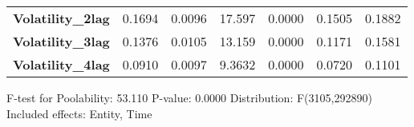 \begin{center}
\begin{tabular}{lcccccc}
\textbf{Volatility\_2lag}              &       0.1694       &       0.0096       &      17.597     &      0.0000      &       0.1505      &       0.1882       \\
\textbf{Volatility\_3lag}              &       0.1376       &       0.0105       &      13.159     &      0.0000      &       0.1171      &       0.1581       \\
\textbf{Volatility\_4lag}              &       0.0910       &       0.0097       &      9.3632     &      0.0000      &       0.0720      &       0.1101       \\
\bottomrule
\end{tabular}
\end{center}

F-test for Poolability: 53.110 \newline
 P-value: 0.0000 \newline
 Distribution: F(3105,292890) \newline
  \newline
 Included effects: Entity, Time